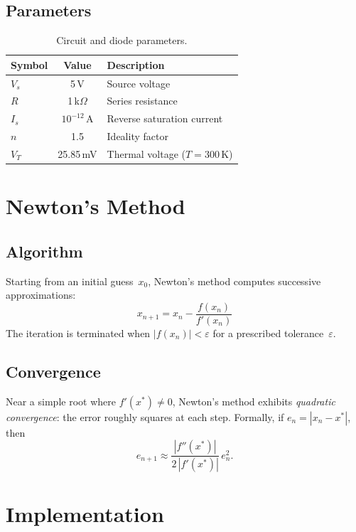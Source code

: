 \documentclass[letterpaper,twocolumn,fleqn]{article}
\begin{document}
\subsection{Parameters}
\begin{table}[H]
\centering
\begin{tabular}{@{}lcl@{}}
\toprule
\textbf{Symbol} & \textbf{Value} & \textbf{Description} \\
\midrule
$V_s$ & 5\,V & Source voltage \\
$R$   & 1\,k$\Omega$ & Series resistance \\
$I_s$ & $10^{-12}$\,A & Reverse saturation current \\
$n$   & 1.5 & Ideality factor \\
$V_T$ & 25.85\,mV & Thermal voltage ($T=300$\,K) \\
\bottomrule
\end{tabular}
\caption{Circuit and diode parameters.}
\label{tab:params}
\end{table}

\section{Newton's Method}

\subsection{Algorithm}
Starting from an initial guess~$x_0$, Newton's method computes successive
approximations:
\begin{equation}
  x_{n+1} = x_n - \frac{f(x_n)}{f'(x_n)}
  \label{eq:newton}
\end{equation}
The iteration is terminated when $|f(x_n)| < \varepsilon$ for a prescribed
tolerance~$\varepsilon$.

\subsection{Convergence}
Near a simple root where $f'(x^*) \neq 0$, Newton's method exhibits
\emph{quadratic convergence}: the error roughly squares at each step.
Formally, if $e_n = |x_n - x^*|$, then
\[
  e_{n+1} \approx \frac{|f''(x^*)|}{2\,|f'(x^*)|}\, e_n^2 .
\]

\section{Implementation}
\end{document}

